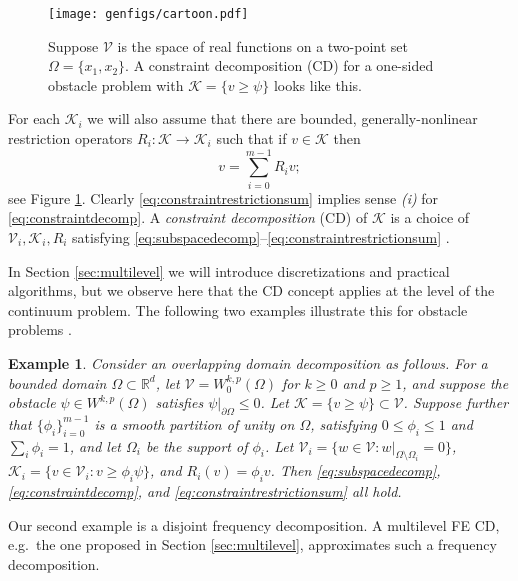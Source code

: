 \documentclass[letterpaper,final,12pt,reqno]{amsart}
\theoremstyle{cstyle}
\theoremstyle{cstyle*}
\theoremstyle{dstyle}
\newtheorem{example}[theorem]{Example}
\numberwithin{equation}{section}
\numberwithin{figure}{section}
\numberwithin{table}{section}
\numberwithin{theorem}{section}
\newcommand{\RR}{\mathbb{R}}
\newcommand{\cK}{\mathcal{K}}
\newcommand{\cV}{\mathcal{V}}
\begin{document}
\begin{figure}[ht]
\texttt{[image: genfigs/cartoon.pdf]}
\caption{Suppose $\mathcal{V}$ is the space of real functions on a two-point set $\Omega=\{x_1,x_2\}$.  A constraint decomposition (CD) for a one-sided obstacle problem with $\mathcal{K}=\{v\ge \psi\}$ looks like this.}
\label{fig:cartoon}
\end{figure}

For each $\cK_i$ we will also assume that there are bounded, generally-nonlinear restriction operators $R_i : \cK \to \cK_i$ such that if $v \in \cK$ then
\begin{equation}
v = \sum_{i=0}^{m-1} R_i v;  \label{eq:constraintrestrictionsum}
\end{equation}
see Figure \ref{fig:cartoon}.  Clearly \eqref{eq:constraintrestrictionsum} implies sense \emph{(i)} for \eqref{eq:constraintdecomp}. A \emph{constraint decomposition} (CD) of $\cK$ is a choice of $\cV_i,\cK_i,R_i$ satisfying \eqref{eq:subspacedecomp}--\eqref{eq:constraintrestrictionsum} \cite{Tai2003}.

In Section \ref{sec:multilevel} we will introduce discretizations and practical algorithms, but we observe here that the CD concept applies at the level of the continuum problem.  The following two examples illustrate this for obstacle problems \cite{GraeserKornhuber2009}.

\begin{example}  \label{ex:domaindecomposition}  Consider an overlapping domain decomposition as follows.  For a bounded domain $\Omega \subset \RR^d$, let $\cV = W_0^{k,p}(\Omega)$ for $k\ge 0$ and $p\ge 1$, and suppose the obstacle $\psi \in W^{k,p}(\Omega)$ satisfies $\psi|_{\partial \Omega} \le 0$.  Let $\cK = \{v \ge \psi\} \subset \cV$.  Suppose further that $\{\phi_i\}_{i=0}^{m-1}$ is a smooth partition of unity on $\Omega$, satisfying $0 \le \phi_i\le 1$ and $\sum_i \phi_i = 1$, and let $\Omega_i$ be the support of $\phi_i$.  Let $\cV_i = \{w \in \cV:w|_{\Omega \setminus \Omega_i} =0 \}$, $\cK_i = \{v \in \cV_i: v \ge \phi_i \psi\}$, and $R_i(v) = \phi_i v$.  Then \eqref{eq:subspacedecomp}, \eqref{eq:constraintdecomp}, and \eqref{eq:constraintrestrictionsum} all hold.
\end{example}

Our second example is a disjoint frequency decomposition.  A multilevel FE CD, e.g.~the one proposed in Section \ref{sec:multilevel}, approximates such a frequency decomposition.
\end{document}
